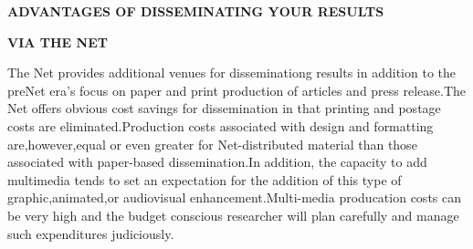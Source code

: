\documentclass[10pt,a4paper]{book}
\begin{document}
\begin{flushleft}
\normalsize
\textbf{ADVANTAGES OF DISSEMINATING YOUR RESULTS}
  
\textbf{VIA THE NET}
\end{flushleft}

The Net provides additional venues for disseminationg results in addition to the preNet era's focus on paper and print production of articles and press release.The Net offers obvious cost savings for dissemination in that printing and postage costs are eliminated.Production costs associated with design and formatting are,however,equal or even greater for Net-distributed material than those associated with paper-based dissemination.In addition, the capacity to add multimedia tends to set an expectation for the addition of this type of graphic,animated,or audiovisual enhancement.Multi-media producation costs can be very high and the budget conscious researcher will plan carefully and manage such expenditures judiciously.
\end{document}

